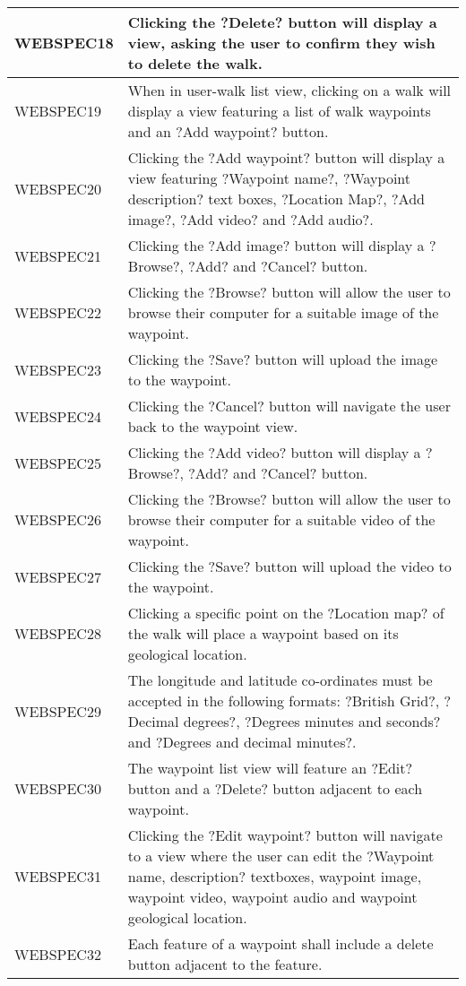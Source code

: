 \documentclass[11pt,a4paper]{article}
\begin{document}
\begin{longtable}{|p{2.5cm}p{13cm}|}
WEBSPEC18 & Clicking the ?Delete? button will display a view, asking the user to confirm they wish to delete the walk. \\ \hline
WEBSPEC19 & When in user-walk list view, clicking on a walk will display a view featuring a list of walk waypoints and an ?Add waypoint? button. \\ \hline
WEBSPEC20 & Clicking the ?Add waypoint? button will display a view featuring ?Waypoint name?, ?Waypoint description? text boxes, ?Location Map?, ?Add image?, ?Add video? and ?Add audio?. \\ \hline
WEBSPEC21 & Clicking the ?Add image? button will display a ?Browse?, ?Add? and ?Cancel? button. \\ \hline
WEBSPEC22 & Clicking the ?Browse? button will allow the user to browse their computer for a suitable image of the waypoint. \\ \hline
WEBSPEC23 & Clicking the ?Save? button will upload the image to the waypoint. \\ \hline
WEBSPEC24 & Clicking the ?Cancel? button will navigate the user back to the waypoint view. \\ \hline
WEBSPEC25 & Clicking the ?Add video? button will display a ?Browse?, ?Add? and ?Cancel? button. \\ \hline
WEBSPEC26 & Clicking the ?Browse? button will allow the user to browse their computer for a suitable video of the waypoint. \\ \hline
WEBSPEC27 & Clicking the ?Save? button will upload the video to the waypoint. \\ \hline
WEBSPEC28 & Clicking a specific point on the ?Location map? of the walk will place a waypoint based on its geological location. \\ \hline
WEBSPEC29 & The longitude and latitude co-ordinates must be accepted in the following formats: ?British Grid?, ?Decimal degrees?, ?Degrees minutes and seconds? and ?Degrees and decimal minutes?. \\ \hline
WEBSPEC30 & The waypoint list view will feature an ?Edit? button and a ?Delete? button adjacent to each waypoint. \\ \hline
WEBSPEC31 & Clicking the ?Edit waypoint? button will navigate to a view where the user can edit the ?Waypoint name, description? textboxes, waypoint image, waypoint video, waypoint audio and waypoint geological location. \\ \hline
WEBSPEC32 & Each feature of a waypoint shall include a delete button adjacent to the feature. \\ \hline

\end{longtable}
\end{document}
